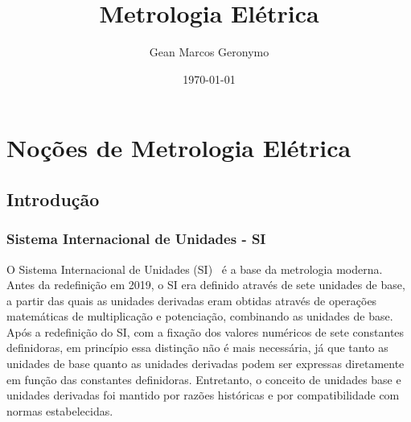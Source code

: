 \documentclass{book}
\title{Metrologia Elétrica}
\author{Gean Marcos Geronymo}
\date{\today}
\begin{document}
\maketitle

\frontmatter

\tableofcontents

\listoffigures
\listoftables

\mainmatter
\part{Noções de Metrologia Elétrica}


\chapter{Introdução}

\section{Sistema Internacional de Unidades - SI}
O Sistema Internacional de Unidades (SI)~\cite{si-brochure,si-ptbr} é a base da metrologia moderna. Antes da redefinição em 2019, o SI era definido através de sete unidades de base, a partir das quais as unidades derivadas eram obtidas através de operações matemáticas de multiplicação e potenciação, combinando as unidades de base. Após a redefinição do SI, com a fixação dos valores numéricos de sete constantes definidoras, em princípio essa distinção não é mais necessária, já que tanto as unidades de base quanto as unidades derivadas podem ser expressas diretamente em função das constantes definidoras. Entretanto, o conceito de unidades base e unidades derivadas foi mantido por razões históricas e por compatibilidade com normas estabelecidas.

\end{document}
